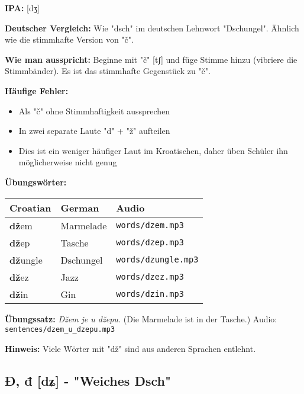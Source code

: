 \begin{tcolorbox}[colback=lightblue!30, colframe=croatianblue, title=\textbf{Dž, dž}]

\textbf{IPA:} [dʒ]

\textbf{Deutscher Vergleich:}
Wie "dsch" im deutschen Lehnwort "Dschungel". Ähnlich wie die stimmhafte Version von "č".

\textbf{Wie man ausspricht:}
Beginne mit "č" [tʃ] und füge Stimme hinzu (vibriere die Stimmbänder). Es ist das stimmhafte Gegenstück zu "č".

\textbf{Häufige Fehler:}
\begin{itemize}
    \item Als "č" ohne Stimmhaftigkeit aussprechen
    \item In zwei separate Laute "d" + "ž" aufteilen
    \item Dies ist ein weniger häufiger Laut im Kroatischen, daher üben Schüler ihn möglicherweise nicht genug
\end{itemize}

\textbf{Übungswörter:}
\begin{tabular}{lll}
\textbf{Croatian} & \textbf{German} & \textbf{Audio} \\
\midrule
\textbf{dž}em & Marmelade & \texttt{words/dzem.mp3} \\
\textbf{dž}ep & Tasche & \texttt{words/dzep.mp3} \\
\textbf{dž}ungle & Dschungel & \texttt{words/dzungle.mp3} \\
\textbf{dž}ez & Jazz & \texttt{words/dzez.mp3} \\
\textbf{dž}in & Gin & \texttt{words/dzin.mp3} \\
\end{tabular}

\textbf{Übungssatz:}
\textit{Džem je u džepu.}
(Die Marmelade ist in der Tasche.)
Audio: \texttt{sentences/dzem\_u\_dzepu.mp3}

\textbf{Hinweis:}
Viele Wörter mit "dž" sind aus anderen Sprachen entlehnt.

\end{tcolorbox}

\subsection{Đ, đ [dʑ] - "Weiches Dsch"}

